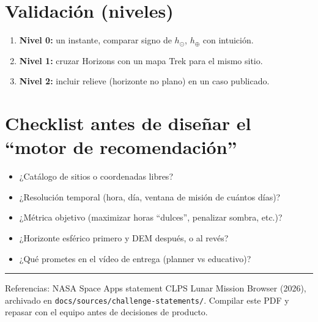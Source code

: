 \documentclass[11pt,a4paper]{article}
\begin{document}
\section{Validación (niveles)}
\begin{enumerate}
  \item \textbf{Nivel 0:} un instante, comparar signo de $h_\odot$, $h_\oplus$ con intuición.
  \item \textbf{Nivel 1:} cruzar Horizons con un mapa Trek para el mismo sitio.
  \item \textbf{Nivel 2:} incluir relieve (horizonte no plano) en un caso publicado.
\end{enumerate}

\section{Checklist antes de diseñar el ``motor de recomendación''}
\begin{itemize}
  \item ¿Catálogo de sitios o coordenadas libres?
  \item ¿Resolución temporal (hora, día, ventana de misión de cuántos días)?
  \item ¿Métrica objetivo (maximizar horas ``dulces'', penalizar sombra, etc.)?
  \item ¿Horizonte esférico primero y DEM después, o al revés?
  \item ¿Qué prometes en el vídeo de entrega (planner vs educativo)?
\end{itemize}

\vfill
\hrule
\small
Referencias: NASA Space Apps statement CLPS Lunar Mission Browser (2026), archivado en \texttt{docs/sources/challenge-statements/}.
Compilar este PDF y repasar con el equipo antes de decisiones de producto.
\end{document}
